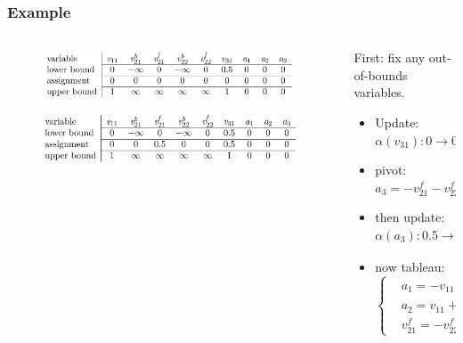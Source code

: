 \documentclass[aspectratio=169%
,serif,mathserif]{beamer}
\begin{document}
\begin{frame}
	\frametitle{Example}
	\begin{columns}
		\begin{column}{.5\textwidth}
			\begin{figure}[htbp]
				\includegraphics[width=1\linewidth]{7.png}
			\end{figure}
			\begin{figure}[htbp]
				\includegraphics[width=1\linewidth]{8.png}
			\end{figure}
		\end{column}

		\begin{column}{.5\textwidth}
				First: fix any out-of-bounds variables.
			\begin{itemize}
				\item Update: $\alpha(v_{31}):0 \to 0.5,\alpha(a_{3}):0 \to 0.5$
				\item pivot: $a_{3}=-v_{21}^{f}-v_{22}^{f}+v_{31} \to v_{21}^{f}=-v_{22}^{f}+v_{31}-a_{3}$
				\item then update: $\alpha(a_{3}):0.5 \to 0,\alpha(v_{21}^f):0 \to 0.5$
				\item now tableau: 
				\begin{equation}
					\left\{
						\begin{array}{lll}
						& a_{1}=-v_{11}+v_{21}^{b} \\
						& a_{2}=v_{11}+v_{22}^{b} \\
						& v_{21}^{f}=-v_{22}^{f}+v_{31}-a_{3}
					\end{array} \right.
				\end{equation}
			\end{itemize}
		\end{column}
	\end{columns}
\end{frame}
\end{document}
